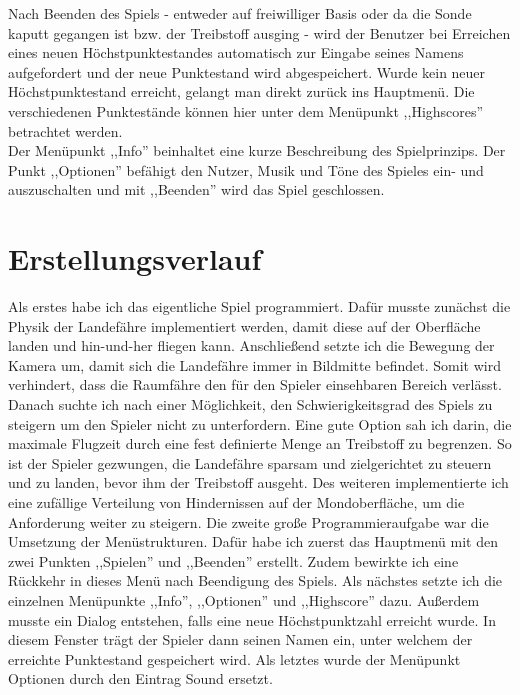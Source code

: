 \documentclass[hidelinks]{article}
\begin{document}
Nach Beenden des Spiels - entweder auf freiwilliger Basis oder da die Sonde kaputt gegangen ist bzw. der Treibstoff ausging - wird der Benutzer bei Erreichen eines neuen Höchstpunktestandes automatisch zur Eingabe seines Namens aufgefordert und der neue Punktestand wird abgespeichert. Wurde kein neuer Höchstpunktestand erreicht, gelangt man direkt zurück ins Hauptmenü. Die verschiedenen Punktestände können hier unter dem Menüpunkt ,,Highscores'' betrachtet werden.\\
Der Menüpunkt ,,Info'' beinhaltet eine kurze Beschreibung des Spielprinzips. Der Punkt ,,Optionen'' befähigt den Nutzer, Musik und Töne des Spieles ein- und auszuschalten und mit ,,Beenden'' wird das Spiel geschlossen. 
\section{Erstellungsverlauf}
Als erstes habe ich das eigentliche Spiel programmiert. Dafür musste zunächst die Physik der Landefähre implementiert werden, damit diese auf der Oberfläche landen und hin-und-her fliegen kann. Anschließend setzte ich die Bewegung der Kamera um, damit sich die Landefähre immer in Bildmitte befindet. Somit wird verhindert, dass die Raumfähre den für den Spieler einsehbaren Bereich verlässt. Danach suchte ich nach einer Möglichkeit, den Schwierigkeitsgrad des Spiels zu steigern um den Spieler nicht zu unterfordern. Eine gute Option sah ich darin, die maximale Flugzeit durch eine fest definierte Menge an Treibstoff zu begrenzen. So ist der Spieler gezwungen, die Landefähre sparsam und zielgerichtet zu steuern und zu landen, bevor ihm der Treibstoff ausgeht. Des weiteren implementierte ich eine zufällige Verteilung von Hindernissen auf der Mondoberfläche, um die Anforderung weiter zu steigern.
Die zweite große Programmieraufgabe war die Umsetzung der Menüstrukturen. Dafür habe ich zuerst das Hauptmenü mit den zwei Punkten ,,Spielen'' und ,,Beenden'' erstellt. Zudem bewirkte ich eine Rückkehr in dieses Menü nach Beendigung des Spiels. Als nächstes setzte ich die einzelnen Menüpunkte ,,Info'', ,,Optionen'' und ,,Highscore'' dazu. Außerdem musste ein Dialog entstehen, falls eine neue Höchstpunktzahl erreicht wurde. In diesem Fenster trägt der Spieler dann seinen Namen ein, unter welchem der erreichte Punktestand gespeichert wird. 
Als letztes wurde der Menüpunkt Optionen durch den Eintrag Sound ersetzt.\\
\end{document}
